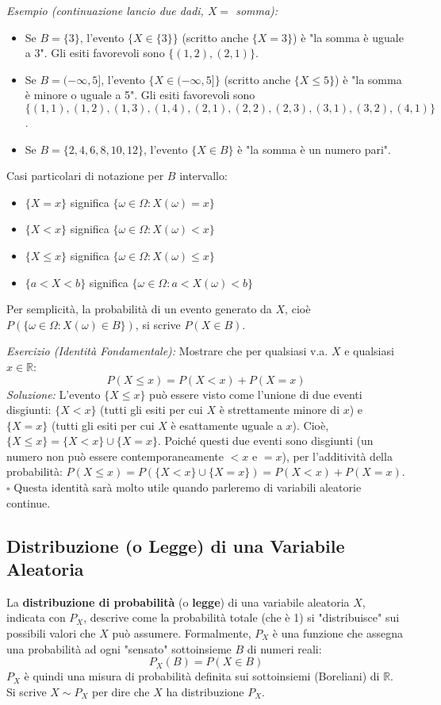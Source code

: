 \textit{Esempio (continuazione lancio due dadi, $X=$ somma):}
\begin{itemize}
    \item Se $B = \{3\}$, l'evento $\{X \in \{3\}\}$ (scritto anche $\{X=3\}$) è "la somma è uguale a 3".
    Gli esiti favorevoli sono $\{(1,2), (2,1)\}$.
    \item Se $B = (-\infty, 5]$, l'evento $\{X \in (-\infty, 5]\}$ (scritto anche $\{X \le 5\}$) è "la somma è minore o uguale a 5".
    Gli esiti favorevoli sono $\{(1,1), (1,2), (1,3), (1,4), (2,1), (2,2), (2,3), (3,1), (3,2), (4,1)\}$.
    \item Se $B = \{2, 4, 6, 8, 10, 12\}$, l'evento $\{X \in B\}$ è "la somma è un numero pari".
\end{itemize}

Casi particolari di notazione per $B$ intervallo:
\begin{itemize}
    \item $\{X = x\}$ significa $\{\omega \in \Omega : X(\omega) = x\}$
    \item $\{X < x\}$ significa $\{\omega \in \Omega : X(\omega) < x\}$
    \item $\{X \le x\}$ significa $\{\omega \in \Omega : X(\omega) \le x\}$
    \item $\{a < X < b\}$ significa $\{\omega \in \Omega : a < X(\omega) < b\}$
\end{itemize}
Per semplicità, la probabilità di un evento generato da $X$, cioè $P(\{\omega \in \Omega: X(\omega) \in B\})$, si scrive $P(X \in B)$.

\textit{Esercizio (Identità Fondamentale):}
Mostrare che per qualsiasi v.a. $X$ e qualsiasi $x \in \mathbb{R}$:
\[ P(X \le x) = P(X < x) + P(X = x) \]
\textit{Soluzione:}
L'evento $\{X \le x\}$ può essere visto come l'unione di due eventi disgiunti:
$\{X < x\}$ (tutti gli esiti per cui $X$ è strettamente minore di $x$) e
$\{X = x\}$ (tutti gli esiti per cui $X$ è esattamente uguale a $x$).
Cioè, $\{X \le x\} = \{X < x\} \cup \{X = x\}$.
Poiché questi due eventi sono disgiunti (un numero non può essere contemporaneamente $<x$ e $=x$), per l'additività della probabilità:
$P(X \le x) = P(\{X < x\} \cup \{X = x\}) = P(X < x) + P(X = x)$. $\square$
Questa identità sarà molto utile quando parleremo di variabili aleatorie continue.

\subsection{Distribuzione (o Legge) di una Variabile Aleatoria}
La \textbf{distribuzione di probabilità} (o \textbf{legge}) di una variabile aleatoria $X$, indicata con $P_X$, descrive come la probabilità totale (che è 1) si "distribuisce" sui possibili valori che $X$ può assumere.
Formalmente, $P_X$ è una funzione che assegna una probabilità ad ogni "sensato" sottoinsieme $B$ di numeri reali:
\[ P_X(B) = P(X \in B) \]
$P_X$ è quindi una misura di probabilità definita sui sottoinsiemi (Boreliani) di $\mathbb{R}$. Si scrive $X \sim P_X$ per dire che $X$ ha distribuzione $P_X$.

